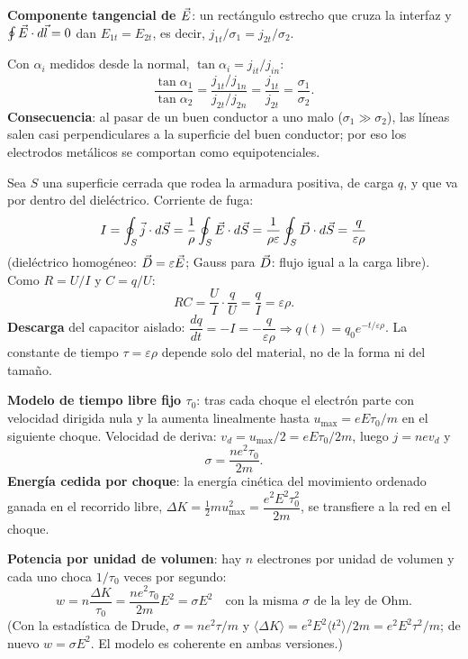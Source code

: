 \textbf{Componente tangencial de $\vec{E}$}: un rectángulo estrecho que cruza la interfaz y $\oint\vec{E}\cdot d\vec l=0$ dan $E_{1t}=E_{2t}$, es decir, $j_{1t}/\sigma_1=j_{2t}/\sigma_2$.

Con $\alpha_i$ medidos desde la normal, $\tan\alpha_i=j_{it}/j_{in}$:
\[
\frac{\tan\alpha_1}{\tan\alpha_2}=\frac{j_{1t}/j_{1n}}{j_{2t}/j_{2n}}=\frac{j_{1t}}{j_{2t}}=\boxed{\frac{\sigma_1}{\sigma_2}}.
\]
\textbf{Consecuencia}: al pasar de un buen conductor a uno malo ($\sigma_1\gg\sigma_2$), las líneas salen casi perpendiculares a la superficie del buen conductor; por eso los electrodos metálicos se comportan como equipotenciales.

Sea $S$ una superficie cerrada que rodea la armadura positiva, de carga $q$, y que va por dentro del dieléctrico. Corriente de fuga:
\[
I=\oint_S\vec{j}\cdot d\vec S=\frac1\rho\oint_S\vec{E}\cdot d\vec S=\frac{1}{\rho\varepsilon}\oint_S\vec{D}\cdot d\vec S=\frac{q}{\varepsilon\rho}
\]
(dieléctrico homogéneo: $\vec{D}=\varepsilon\vec{E}$; Gauss para $\vec{D}$: flujo igual a la carga libre). Como $R=U/I$ y $C=q/U$:
\[
RC=\frac UI\cdot\frac qU=\frac qI=\boxed{\varepsilon\rho}.
\]
\textbf{Descarga} del capacitor aislado: $\dfrac{dq}{dt}=-I=-\dfrac{q}{\varepsilon\rho}\Rightarrow\boxed{q(t)=q_0e^{-t/\varepsilon\rho}}$. La constante de tiempo $\tau=\varepsilon\rho$ depende solo del material, no de la forma ni del tamaño.

\textbf{Modelo de tiempo libre fijo $\tau_0$}: tras cada choque el electrón parte con velocidad dirigida nula y la aumenta linealmente hasta $u_{\max}=eE\tau_0/m$ en el siguiente choque. Velocidad de deriva: $v_d=u_{\max}/2=eE\tau_0/2m$, luego $j=nev_d$ y
\[
\sigma=\frac{ne^2\tau_0}{2m}.
\]
\textbf{Energía cedida por choque}: la energía cinética del movimiento ordenado ganada en el recorrido libre, $\Delta K=\tfrac12mu_{\max}^2=\dfrac{e^2E^2\tau_0^2}{2m}$, se transfiere a la red en el choque.

\textbf{Potencia por unidad de volumen}: hay $n$ electrones por unidad de volumen y cada uno choca $1/\tau_0$ veces por segundo:
\[
w=n\frac{\Delta K}{\tau_0}=\frac{ne^2\tau_0}{2m}E^2=\boxed{\sigma E^2}\quad\text{con la misma }\sigma\text{ de la ley de Ohm.}
\]
(Con la estadística de Drude, $\sigma=ne^2\tau/m$ y $\langle\Delta K\rangle=e^2E^2\langle t^2\rangle/2m=e^2E^2\tau^2/m$; de nuevo $w=\sigma E^2$. El modelo es coherente en ambas versiones.)

